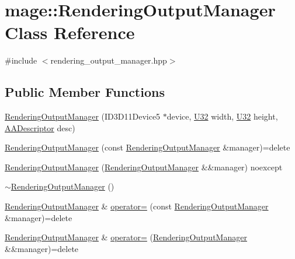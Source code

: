 \hypertarget{classmage_1_1_rendering_output_manager}{}\section{mage\+:\+:Rendering\+Output\+Manager Class Reference}
\label{classmage_1_1_rendering_output_manager}


{\ttfamily \#include $<$rendering\+\_\+output\+\_\+manager.\+hpp$>$}

\subsection*{Public Member Functions}
\begin{DoxyCompactItemize}
\item 
\hyperlink{classmage_1_1_rendering_output_manager_acbf3f32fdfaeb97e100c07b2197fe0b7}{Rendering\+Output\+Manager} (I\+D3\+D11\+Device5 $\ast$device, \hyperlink{namespacemage_a41c104c036fba3756a74e19f793eeaa1}{U32} width, \hyperlink{namespacemage_a41c104c036fba3756a74e19f793eeaa1}{U32} height, \hyperlink{namespacemage_a86cd40b8f2f42ca4d616cc6ec665a7f2}{A\+A\+Descriptor} desc)
\item 
\hyperlink{classmage_1_1_rendering_output_manager_acd8d30bacabd163e75d5d1dfdaf13976}{Rendering\+Output\+Manager} (const \hyperlink{classmage_1_1_rendering_output_manager}{Rendering\+Output\+Manager} \&manager)=delete
\item 
\hyperlink{classmage_1_1_rendering_output_manager_a39421535b27a270a759cb1f9d171435f}{Rendering\+Output\+Manager} (\hyperlink{classmage_1_1_rendering_output_manager}{Rendering\+Output\+Manager} \&\&manager) noexcept
\item 
\hyperlink{classmage_1_1_rendering_output_manager_ac6c1b4ce353870ea603982623962b2f4}{$\sim$\+Rendering\+Output\+Manager} ()
\item 
\hyperlink{classmage_1_1_rendering_output_manager}{Rendering\+Output\+Manager} \& \hyperlink{classmage_1_1_rendering_output_manager_ab31c30892c950603e39208a918ac9d49}{operator=} (const \hyperlink{classmage_1_1_rendering_output_manager}{Rendering\+Output\+Manager} \&manager)=delete
\item 
\hyperlink{classmage_1_1_rendering_output_manager}{Rendering\+Output\+Manager} \& \hyperlink{classmage_1_1_rendering_output_manager_a491a7ef504f7ff8292fddeca7efdb130}{operator=} (\hyperlink{classmage_1_1_rendering_output_manager}{Rendering\+Output\+Manager} \&\&manager)=delete
\item 

\end{DoxyCompactItemize}
